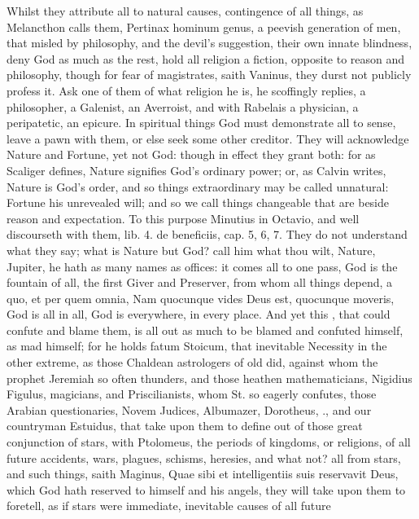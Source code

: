 {Whilst they attribute all to natural causes, contingence of all
things, as Melancthon calls them, Pertinax hominum genus, a peevish
generation of men, that misled by philosophy, and the devil's
suggestion, their own innate blindness, deny God as much as the rest,
hold all religion a fiction, opposite to reason and philosophy, though
for fear of magistrates, saith Vaninus, they durst not publicly
profess it. Ask one of them of what religion he is, he scoffingly
replies, a philosopher, a Galenist, an Averroist, and with
Rabelais a physician, a peripatetic, an epicure. In spiritual things
God must demonstrate all to sense, leave a pawn with them, or else seek
some other creditor. They will acknowledge Nature and Fortune, yet not
God: though in effect they grant both: for as Scaliger defines, Nature
signifies God's ordinary power; or, as Calvin writes, Nature is God's
order, and so things extraordinary may be called unnatural: Fortune his
unrevealed will; and so we call things changeable that are beside
reason and expectation. To this purpose Minutius in Octavio, and
 \Seneca well discourseth with them, lib. 4. de beneficiis, cap.
5, 6, 7. They do not understand what they say; what is Nature but God?
call him what thou wilt, Nature, Jupiter, he hath as many names as
offices: it comes all to one pass, God is the fountain of all, the
first Giver and Preserver, from whom all things depend, a quo, et
per quem omnia, Nam quocunque vides Deus est, quocunque moveris, God is
all in all, God is everywhere, in every place. And yet this \Seneca,
that could confute and blame them, is all out as much to be blamed and
confuted himself, as mad himself; for he holds fatum Stoicum, that
inevitable Necessity in the other extreme, as those Chaldean
astrologers of old did, against whom the prophet Jeremiah so often
thunders, and those heathen mathematicians, Nigidius Figulus,
magicians, and Priscilianists, whom St. \Austin{} so eagerly confutes,
those Arabian questionaries, Novem Judices, Albumazer, Dorotheus, \etc{}.,
and our countryman Estuidus, that take upon them to define out of
those great conjunction of stars, with Ptolomeus, the periods of
kingdoms, or religions, of all future accidents, wars, plagues,
schisms, heresies, and what not? all from stars, and such things, saith
Maginus, Quae sibi et intelligentiis suis reservavit Deus, which God
hath reserved to himself and his angels, they will take upon them to
foretell, as if stars were immediate, inevitable causes of all future
}
